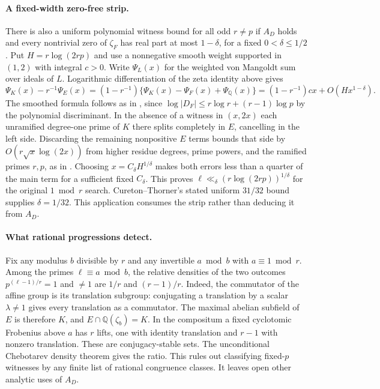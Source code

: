 \documentclass[11pt]{article}
\newcommand{\Q}{\mathbb Q}
\begin{document}
\paragraph{A fixed-width zero-free strip.}
There is also a uniform polynomial witness bound for all odd $r\ne p$ if
$A_D$ holds and every nontrivial zero of $\zeta_F$ has real part at most
$1-\delta$, for a fixed $0<\delta\le1/2$. Put $H=r\log(2rp)$ and use a
nonnegative smooth weight supported in $(1,2)$ with integral $c>0$. Write
$\Psi_L(x)$ for the weighted von Mangoldt sum over ideals of $L$.
Logarithmic differentiation of the zeta identity above gives
\[
 \Psi_K(x)-r^{-1}\Psi_E(x)
 =(1-r^{-1})\{\Psi_K(x)-\Psi_F(x)+\Psi_\Q(x)\}
 =(1-r^{-1})cx+O(Hx^{1-\delta}).
\]
The smoothed formula follows as in \cite[Lemma 11.2]{PF}, since
$\log|D_F|\le r\log r+(r-1)\log p$ by the polynomial discriminant.
In the absence of a witness in $(x,2x)$ each unramified degree-one prime
of $K$ there splits completely in $E$, cancelling in the left side.
Discarding the remaining nonpositive $E$ terms bounds that side by
$O(r\sqrt x\log(2x))$ from higher residue degrees, prime powers, and the
ramified primes $r,p$, as in \cite[Lemma 2.1]{Tang}.
Choosing $x=C_\delta H^{1/\delta}$ makes both errors less than a quarter
of the main term for a sufficient fixed $C_\delta$. This proves
$\ell\ll_\delta (r\log(2rp))^{1/\delta}$ for the original $1\bmod r$ search.
Cureton--Thorner's stated uniform $31/32$ bound supplies $\delta=1/32$.
This application consumes the strip rather than deducing it from $A_D$.

\paragraph{What rational progressions detect.}
Fix any modulus $b$ divisible by $r$ and any invertible $a\bmod b$ with
$a\equiv1\bmod r$. Among the primes $\ell\equiv a\bmod b$, the relative
densities of the two outcomes $p^{(\ell-1)/r}=1$ and $\ne1$ are
$1/r$ and $(r-1)/r$. Indeed, the commutator of the affine group is its
translation subgroup: conjugating a translation by a scalar $\lambda\ne1$
gives every translation as a commutator. The maximal abelian subfield of
$E$ is therefore $K$, and $E\cap\Q(\zeta_b)=K$. In the compositum a fixed
cyclotomic Frobenius above $a$ has $r$ lifts, one with identity translation
and $r-1$ with nonzero translation. These are conjugacy-stable sets. The
unconditional Chebotarev density theorem gives the ratio. This rules out
classifying fixed-$p$ witnesses by any finite list of rational congruence classes.
It leaves open other analytic uses of $A_D$.
\end{document}
